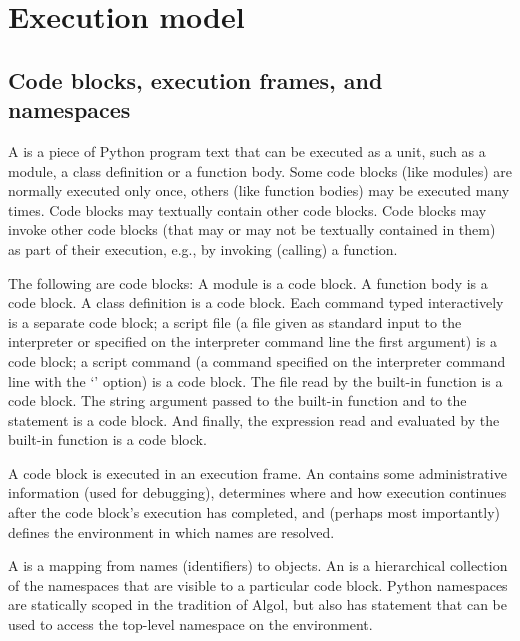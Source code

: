 \chapter{Execution model \label{execmodel}}

\section{Code blocks, execution frames, and namespaces \label{execframes}}

A  is a piece
of Python program text that can be executed as a unit, such as a
module, a class definition or a function body.  Some code blocks (like
modules) are normally executed only once, others (like function
bodies) may be executed many times.  Code blocks may textually contain
other code blocks.  Code blocks may invoke other code blocks (that may
or may not be textually contained in them) as part of their execution,
e.g., by invoking (calling) a function.

The following are code blocks: A module is a code block.  A function
body is a code block.  A class definition is a code block.  Each
command typed interactively is a separate code block; a script file (a
file given as standard input to the interpreter or specified on the
interpreter command line the first argument) is a code block; a script
command (a command specified on the interpreter command line with the
`' option) is a code block.  The file read by the built-in
function  is a code block.  The string argument
passed to the built-in function  and to the
 statement is a code block.  And finally, the expression
read and evaluated by the built-in function  is a
code block.

A code block is executed in an execution frame.  An  contains some administrative
information (used for debugging), determines where and how execution
continues after the code block's execution has completed, and (perhaps
most importantly) defines the environment in which names are resolved.

A  is a mapping from names
(identifiers) to objects.  An  is
a hierarchical collection of the namespaces that are visible to a
particular code block.  Python namespaces are statically scoped in the
tradition of Algol, but also has  statement that can
be used to access the top-level namespace on the environment.

